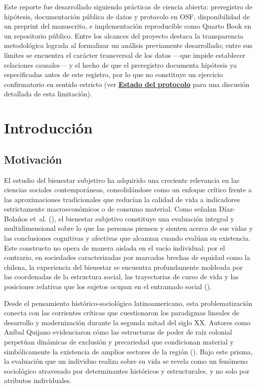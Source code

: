 \documentclass[
  spanish,
  a4paper,
  oneside]{scrbook}
\begin{document}
Este reporte fue desarrollado siguiendo prácticas de ciencia abierta:
preregistro de hipótesis, documentación pública de datos y protocolo en
OSF, disponibilidad de un preprint del manuscrito, e implementación
reproducible como Quarto Book en un repositorio público. Entre los
alcances del proyecto destaca la transparencia metodológica lograda al
formalizar un análisis previamente desarrollado; entre sus límites se
encuentra el carácter transversal de los datos ---que impide establecer
relaciones causales--- y el hecho de que el preregistro documenta
hipótesis ya especificadas antes de este registro, por lo que no
constituye un ejercicio confirmatorio en sentido estricto (ver
\hyperref[sec-hipotesis]{\textbf{Estado del protocolo}} para una
discusión detallada de esta limitación).


\chapter{Introducción}\label{introducciuxf3n}

\section{Motivación}\label{motivaciuxf3n}

El estudio del bienestar subjetivo ha adquirido una creciente relevancia
en las ciencias sociales contemporáneas, consolidándose como un enfoque
crítico frente a las aproximaciones tradicionales que reducían la
calidad de vida a indicadores estrictamente macroeconómicos o de consumo
material. Como señalan Díaz-Bolaños et~al.
(), el bienestar subjetivo constituye una
evaluación integral y multidimensional sobre lo que las personas piensen
y sienten acerca de sus vidas y las conclusiones cognitivas y afectivas
que alcanzan cuando evalúan su existencia. Este constructo no opera de
manera aislada en el vacío individual; por el contrario, en sociedades
caracterizadas por marcadas brechas de equidad como la chilena, la
experiencia del bienestar se encuentra profundamente moldeada por las
coordenadas de la estructura social, las trayectorias de curso de vida y
las posiciones relativas que los sujetos ocupan en el entramado social
().

Desde el pensamiento histórico-sociológico latinoamericano, esta
problematización conecta con las corrientes críticas que cuestionaron
los paradigmas lineales de desarrollo y modernización durante la segunda
mitad del siglo XX. Autores como Aníbal Quijano evidenciaron cómo las
estructuras de poder de raíz colonial perpetúan dinámicas de exclusión y
precariedad que condicionan material y simbólicamente la existencia de
amplios sectores de la región ().
Bajo este prisma, la evaluación que un individuo realiza sobre su vida
se revela como un fenómeno sociológico atravesado por determinantes
históricos y estructurales, y no solo por atributos individuales.
\end{document}
